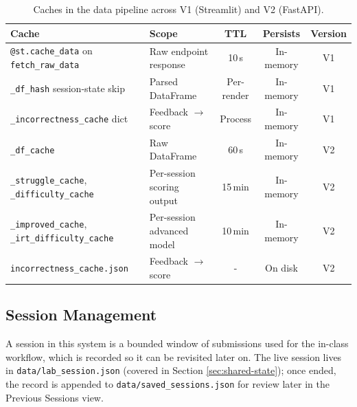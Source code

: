 \begin{table}[H]
\centering
\small
\begin{tabular}{|>{\raggedright\arraybackslash}p{}|>{\raggedright\arraybackslash}p{}|c|c|c|}
\hline
\textbf{Cache} & \textbf{Scope} & \textbf{TTL} & \textbf{Persists} & \textbf{Version} \\
\hline\hline
\texttt{@st.cache\_data} on \texttt{fetch\_raw\_data} & Raw endpoint response & 10\,s & In-memory & V1 \\
\hline
\texttt{\_df\_hash} session-state skip & Parsed DataFrame & Per-render & In-memory & V1 \\
\hline
\texttt{\_incorrectness\_cache} dict & Feedback $\to$ score & Process & In-memory & V1 \\
\hline
\texttt{\_df\_cache} & Raw DataFrame & 60\,s & In-memory & V2 \\
\hline
\texttt{\_struggle\_cache}, \texttt{\_difficulty\_cache} & Per-session scoring output & 15\,min & In-memory & V2 \\
\hline
\texttt{\_improved\_cache}, \texttt{\_irt\_difficulty\_cache} & Per-session advanced model & 10\,min & In-memory & V2 \\
\hline
\texttt{incorrectness\_cache.json} & Feedback $\to$ score & - & On disk & V2 \\
\hline
\end{tabular}
\caption{Caches in the data pipeline across V1 (Streamlit) and V2 (FastAPI).}
\label{tab:cache-hierarchy}
\end{table}


\subsection{Session Management} \label{sec:session}

A session in this system is a bounded window of submissions used for the in-class workflow, which is recorded so it can be revisited later on.
The live session lives in \texttt{data/lab\_session.json} (covered in Section \ref{sec:shared-state}); once ended, the record is appended to \texttt{data/saved\_sessions.json} for review later in the Previous Sessions view.

